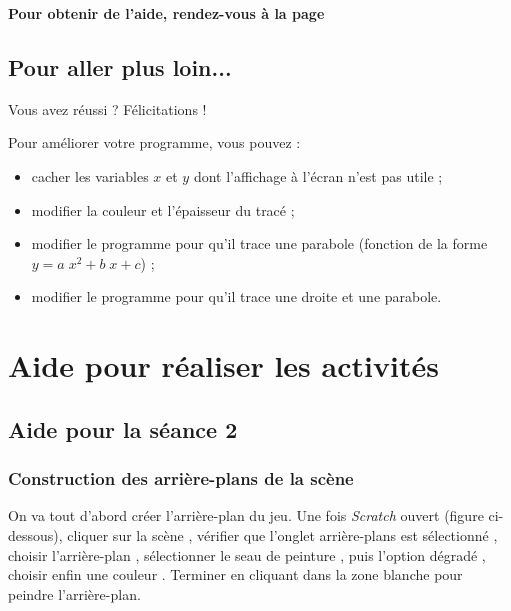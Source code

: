 
\textbf{Pour obtenir de l'aide, rendez-vous à la page \pageref{aide_seanceScratch3}}

\subsection{Pour aller plus loin...}

Vous avez réussi ? Félicitations !

\vspace{6pt}

Pour améliorer votre programme, vous pouvez :

\begin{itemize}
\item cacher les variables $x$ et $y$ dont l'affichage à l'écran n'est pas utile ;
\item modifier la couleur et l'épaisseur du tracé ; 
\item modifier le programme pour qu'il trace une parabole (fonction de la forme $y=a \; x^2 + b \; x + c$) ;
\item modifier le programme pour qu'il trace une droite et une parabole. 
\end{itemize}


\newpage

\section{Aide pour réaliser les activités}

\subsection{Aide pour la séance 2}\label{aide_seanceScratch2}

\subsubsection{Construction des arrière-plans de la scène}

On va tout d'abord créer l'arrière-plan du jeu. Une fois \emph{Scratch} ouvert (figure ci-dessous), cliquer sur la scène , vérifier que l'onglet arrière-plans est sélectionné , choisir l'arrière-plan  , sélectionner le seau de peinture , puis l'option dégradé , choisir enfin une couleur . Terminer en cliquant dans la zone blanche pour peindre l'arrière-plan.

